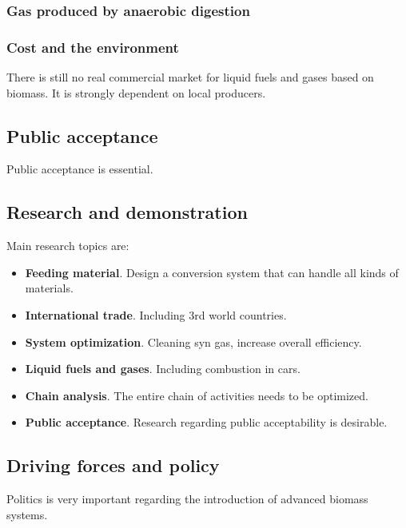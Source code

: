 \documentclass[a4paper,10pt]{article}
\begin{document}
\subsubsection{Gas produced by anaerobic digestion}
\subsubsection{Cost and the environment}
There is still no real commercial market for liquid fuels and gases based on biomass. It is strongly dependent on local producers. 

\subsection{Public acceptance}
Public acceptance is essential. 

\subsection{Research and demonstration}
Main research topics are:
\begin{itemize}
 \item \textbf{Feeding material}. Design a conversion system that can handle all kinds of materials.
 \item \textbf{International trade}. Including 3rd world countries.
 \item \textbf{System optimization}. Cleaning syn gas, increase overall efficiency.
 \item \textbf{Liquid fuels and gases}. Including combustion in cars.
 \item \textbf{Chain analysis}. The entire chain of activities needs to be optimized.
 \item \textbf{Public acceptance}. Research regarding public acceptability is desirable.
\end{itemize}



\subsection{Driving forces and policy}
Politics is very important regarding the introduction of advanced biomass systems.
\end{document}
